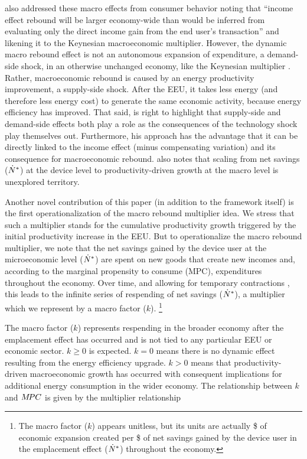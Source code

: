 \documentclass[12pt]{article}\usepackage[]{graphicx}\usepackage[]{xcolor}
\begin{document}
\citeauthor{Borenstein:2015aa} also addressed these macro effects 
from consumer behavior
noting that ``income effect rebound will be larger economy-wide than 
would be inferred from evaluating only the direct income gain from 
the end user's transaction'' \citep[p.~11]{Borenstein:2015aa} and 
likening it to the Keynesian macroeconomic multiplier.
However, the dynamic macro rebound effect 
is not an autonomous expansion of expenditure,
a demand-side shock,
in an otherwise unchanged economy,
like the Keynesian multiplier \citep{Kahn1931,Keynes1936}.
Rather, macroeconomic rebound is caused by an energy productivity improvement,
a supply-side shock.
After the EEU, 
it takes less energy (and therefore less energy cost)
to generate the same economic activity, because 
energy efficiency has improved.
That said, \citeauthor{Borenstein:2015aa} is right to highlight that supply-side 
and demand-side effects both play a role as the consequences of the
technology shock play themselves out.
Furthermore, his approach has the advantage that it can be directly
linked to the income effect
(minus compensating variation) 
and its consequence for macroeconomic rebound. 
\citeauthor{Borenstein:2015aa} also notes that scaling from net 
savings (${\dot{N}}^*$) at the device level
to productivity-driven growth at the macro level is unexplored territory.

Another novel contribution of this paper
(in addition to the framework itself)
is the first operationalization of the macro rebound multiplier idea.
We stress that such a multiplier stands for the cumulative
productivity growth triggered by
the initial productivity increase in the EEU.
But to operationalize the macro rebound multiplier, 
we note that the net savings gained by the 
device user at the microeconomic level (${\dot{N}}^*$)
are spent on new goods that create new incomes and,
according to the marginal propensity to consume (MPC),
expenditures throughout the economy. 
Over time, 
and allowing for temporary contractions \citep{Basu2006},
this leads to the infinite series of
respending of net savings (${\dot{N}}^*$),
a multiplier which we represent by a macro factor ($k$).%
\footnote{
  The macro factor ($k$) appears unitless,
  but its units are actually \$ of economic expansion created 
  per \$ of net savings gained
  by the device user in the emplacement effect (${\dot{N}}^*$)
  throughout the economy.
}

The macro factor ($k$) represents respending in the broader economy 
after the emplacement effect has occurred
and is not tied to any particular EEU or economic sector.
$k \ge 0$ is expected.
$k = 0$ means there is no dynamic effect
resulting from the energy efficiency upgrade.
$k > 0$ means that productivity-driven macroeconomic growth has occurred
with consequent implications for additional energy consumption in the wider economy.
The relationship between $k$ and $M\!PC$ is given by the multiplier relationship
\end{document}
